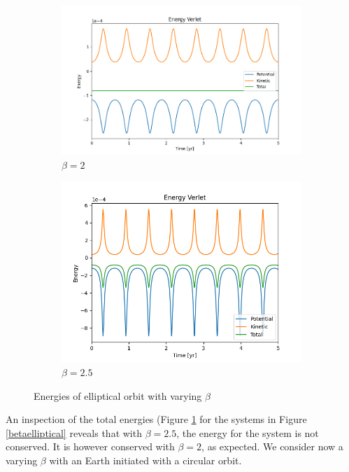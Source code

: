 	\begin{figure}[H]
	    \centering
	    \begin{subfigure}{0.52\linewidth}
	        \includegraphics[width=1\linewidth]{Figure/VerletEnergy_elliptical_B200.png}
	        \caption{$\beta = 2$}
	   \end{subfigure}
	   \begin{subfigure}{0.45\linewidth}
	        \includegraphics[width=1\linewidth]{Figure/VerletEnergy_elliptical_B250.png}
	        \caption{$\beta = 2.5$}
	   \end{subfigure}
	   \caption{Energies of elliptical orbit with varying $\beta$}
	   \label{EllipticalEnergy}
    \end{figure}
    
	
	An inspection of the total energies (Figure \ref{EllipticalEnergy} for the systems in Figure \ref{betaelliptical} reveals that with $\beta = 2.5$, the energy for the system is not conserved. It is however conserved with $\beta = 2$, as expected. We consider now a varying $\beta$ with an Earth initiated with a circular orbit.
	  
